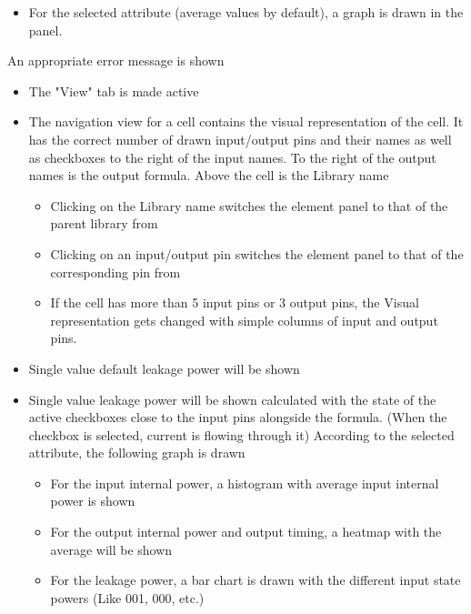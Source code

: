\documentclass[10pt,a4paper]{report}
\begin{document}
\begin{FR}
{\begin{itemize}
\begin{itemize}
            \end{itemize}
        \item For the selected attribute (average values by default), a graph is drawn in the panel.
    \end{itemize}}
    {An appropriate error message is shown}
    {\begin{itemize}
        \item The "View" tab is made active
    \end{itemize}}
    {\begin{itemize}
        \item The navigation view for a cell contains the visual representation of the cell. It has the correct number of drawn input/output pins and their names as well as checkboxes to the right of the input names. To the right of the output names is the output formula. Above the cell is the Library name
        \begin{itemize}
            \item Clicking on the Library name switches the element panel to that of the parent library from \label{FR-BLABLABLA}
            \item Clicking on an input/output pin switches the element panel to that of the corresponding pin from \label{FR-BLABLABLA}
            \item If the cell has more than 5 input pins or 3 output pins, the Visual representation gets changed with simple columns of input and output pins.
        \end{itemize}
        \item Single value default leakage power will be shown
        \item Single value leakage power will be shown calculated with the state of the active checkboxes close to the input pins alongside the formula. (When the checkbox is selected, current is flowing through it)
        According to the selected attribute, the following graph is drawn
        \begin{itemize}
            \item For the input internal power, a histogram with average input internal power is shown
            \item For the output internal power and output timing, a heatmap with the average will be shown
            \item For the leakage power, a bar chart is drawn with the different input state powers (Like 001, 000, etc.)
        \end{itemize}

\end{itemize}}
\end{FR}
\end{document}
